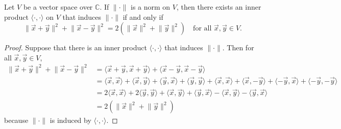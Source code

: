 \documentclass{homework}
\begin{document}
	\maketitle
	
	\question Let $V$ be a vector space over $\mathbb{C}$. If $\lVert \cdot \rVert$ is a norm on $V$, then there exists an inner product $\langle \cdot, \cdot\rangle$ on $V$ that induces $\lVert \cdot \rVert$ if and only if
	\begin{equation}
		\label{eq:parallelogram}
		\lVert \vec{x} + \vec{y} \rVert^2 + \lVert \vec{x} - \vec{y}\rVert^2 = 2(\lVert \vec{x}\rVert^2 + \lVert \vec{y}\rVert^2) \quad \text{for all $\vec{x}, \vec{y}\in V$.}
	\end{equation}
	
	\begin{proof}
		Suppose that there is an inner product $\langle\cdot, \cdot\rangle$ that induces $\lVert\cdot\rVert$. Then for all $\vec{x},\vec{y}\in V$,
		\begin{equation*}
			\begin{aligned}
				\lVert \vec{x} +\vec{y}\rVert^2 + \lVert \vec{x} - \vec{y}\rVert^2 &= \langle\vec{x}+\vec{y},\vec{x}+ \vec{y}\rangle + \langle\vec{x}-\vec{y},\vec{x}-\vec{y}\rangle  \\
				&= \langle\vec{x},\vec{x}\rangle  + \langle\vec{x},\vec{y}\rangle + \langle\vec{y},\vec{x}\rangle +  \langle\vec{y},\vec{y}\rangle + \langle\vec{x},\vec{x}\rangle +\langle\vec{x},-\vec{y}\rangle + \langle-\vec{y},\vec{x}\rangle + \langle-\vec{y},-\vec{y}\rangle \\
				&= 2\langle\vec{x},\vec{x}\rangle + 2\langle\vec{y},\vec{y}\rangle + \langle\vec{x},\vec{y}\rangle + \langle\vec{y},\vec{x}\rangle - \langle\vec{x},\vec{y}\rangle - \langle\vec{y},\vec{x}\rangle \\
				&= 2(\lVert\vec{x}\rVert^2 + \lVert\vec{y}\rVert^2)
			\end{aligned}
		\end{equation*}
		because $\lVert\cdot\rVert$ is induced by $\langle\cdot,\cdot\rangle$.
		

\end{proof}
\end{document}
